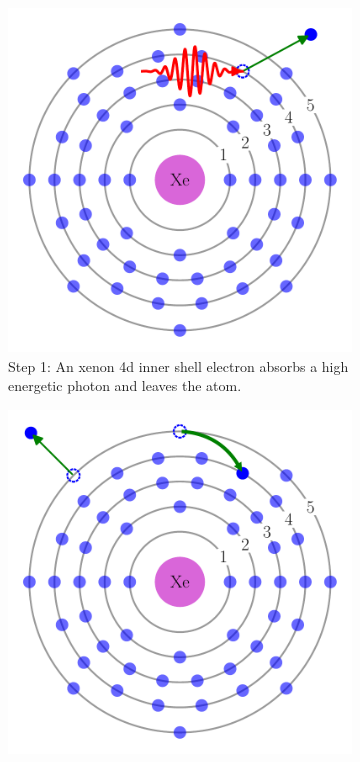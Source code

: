 \begin{figure}
 \centering
    \begin{subfigure}{0.48\columnwidth}
        \centering
        \includegraphics[width=\textwidth]{figures/auger_step_1}
        \caption{Step 1: An xenon 4d inner shell electron absorbs a high
                 energetic photon and leaves the atom. \\}
        \label{fig:auger:1}
    \end{subfigure}
    \begin{subfigure}{0.48\columnwidth}
        \centering
        \includegraphics[width=\textwidth]{figures/auger_step_2}

\end{subfigure}
\end{figure}
